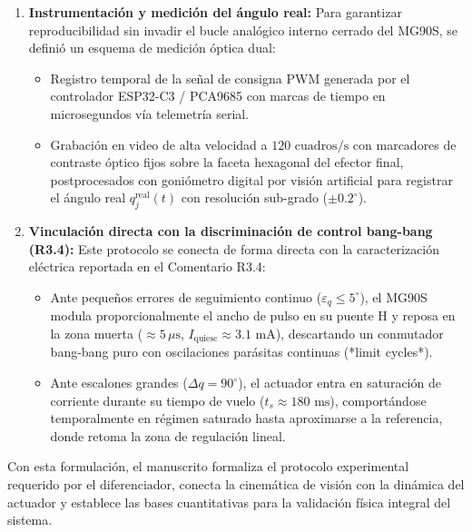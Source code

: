 \documentclass{LabDSTresponse}
\begin{document}
{\begin{enumerate}
    \item \textbf{Instrumentación y medición del ángulo real:}
    Para garantizar reproducibilidad sin invadir el bucle analógico interno cerrado del MG90S, se definió un esquema de medición óptica dual:
    \begin{itemize}
        \item Registro temporal de la señal de consigna PWM generada por el controlador ESP32-C3 / PCA9685 con marcas de tiempo en microsegundos vía telemetría serial.
        \item Grabación en video de alta velocidad a $120\text{ cuadros/s}$ con marcadores de contraste óptico fijos sobre la faceta hexagonal del efector final, postprocesados con goniómetro digital por visión artificial para registrar el ángulo real $q_j^{\text{real}}(t)$ con resolución sub-grado ($\pm 0.2^\circ$).
    \end{itemize}

    \item \textbf{Vinculación directa con la discriminación de control bang-bang (R3.4):}
    Este protocolo se conecta de forma directa con la caracterización eléctrica reportada en el Comentario R3.4:
    \begin{itemize}
        \item Ante pequeños errores de seguimiento continuo ($\varepsilon_q \le 5^\circ$), el MG90S modula proporcionalmente el ancho de pulso en su puente H y reposa en la zona muerta ($\approx 5\,\mu\text{s}$, $I_{\text{quiesc}} \approx 3.1\text{ mA}$), descartando un conmutador bang-bang puro con oscilaciones parásitas continuas (*limit cycles*).
        \item Ante escalones grandes ($\Delta q = 90^\circ$), el actuador entra en saturación de corriente durante su tiempo de vuelo ($t_s \approx 180\text{ ms}$), comportándose temporalmente en régimen saturado hasta aproximarse a la referencia, donde retoma la zona de regulación lineal.
    \end{itemize}
\end{enumerate}

Con esta formulación, el manuscrito formaliza el protocolo experimental requerido por el diferenciador, conecta la cinemática de visión con la dinámica del actuador y establece las bases cuantitativas para la validación física integral del sistema.}
\end{document}

